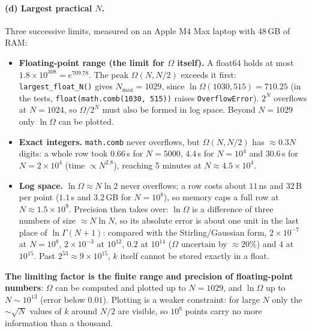 \paragraph{(d) Largest practical $N$.} Three successive limits, measured on an Apple M4 Max laptop with 48\,GB of RAM:
\begin{itemize}
\item \textbf{Floating-point range (the limit for $\Omega$ itself).} A float64 holds at most $1.8\times10^{308}=e^{709.78}$. The peak $\Omega(N,N/2)$ exceeds it first: \texttt{largest\_float\_N()} gives $N_{\max}=1029$, since $\ln\Omega(1030,515)=710.25$ (in the tests, \texttt{float(math.comb(1030, 515))} raises \texttt{OverflowError}). $2^N$ overflows at $N=1024$, so $\Omega/2^N$ must also be formed in log space. Beyond $N=1029$ only $\ln\Omega$ can be plotted.
\item \textbf{Exact integers.} \texttt{math.comb} never overflows, but $\Omega(N,N/2)$ has $\approx0.3N$ digits: a whole row took $0.66$\,s for $N=5000$, $4.4$\,s for $N=10^4$ and $30.6$\,s for $N=2\times10^4$ (time $\propto N^{2.8}$), reaching 5 minutes at $N\approx4.5\times10^4$.
\item \textbf{Log space.} $\ln\Omega\approx N\ln2$ never overflows; a row costs about $11$\,ns and $32$\,B per point ($1.1$\,s and $3.2$\,GB for $N=10^8$), so memory caps a full row at $N\approx1.5\times10^9$. Precision then takes over: $\ln\Omega$ is a difference of three numbers of size $\approx N\ln N$, so its absolute error is about one unit in the last place of $\ln\Gamma(N+1)$: compared with the Stirling/Gaussian form, $2\times10^{-7}$ at $N=10^8$, $2\times10^{-3}$ at $10^{12}$, $0.2$ at $10^{14}$ ($\Omega$ uncertain by $\approx20\%$) and $4$ at $10^{15}$. Past $2^{53}\approx9\times10^{15}$, $k$ itself cannot be stored exactly in a float.
\end{itemize}
\textbf{The limiting factor is the finite range and precision of floating-point numbers}: $\Omega$ can be computed and plotted up to $N=1029$, and $\ln\Omega$ up to $N\sim10^{13}$ (error below $0.01$). Plotting is a weaker constraint: for large $N$ only the $\sim\sqrt N$ values of $k$ around $N/2$ are visible, so $10^8$ points carry no more information than a thousand.

